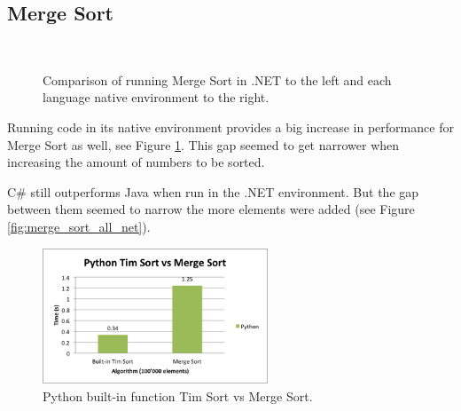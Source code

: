 \subsection{Merge Sort}

\begin{figure}[h]
	\centering
	\mbox{
	}
	\caption{Comparison of running Merge Sort in .NET to the left and each language native environment to the right.}
	\label{fig:merge_sort_net_native}
\end{figure}


Running code in its native environment provides a big increase in performance for Merge Sort as well, see Figure \ref{fig:merge_sort_net_native}. This gap seemed to get narrower when increasing the amount of numbers to be sorted.

C\# still outperforms Java when run in the .NET environment. But the gap between them seemed to narrow the more elements were added (see Figure \ref{fig:merge_sort_all_net}). 

\begin{figure}[h]
	\centering
	\includegraphics[width=0.6\textwidth]{chapters/media/tim_sort.png}
	\caption{Python built-in function Tim Sort vs Merge Sort.}
	\label{fig:tim_sort}
\end{figure}


